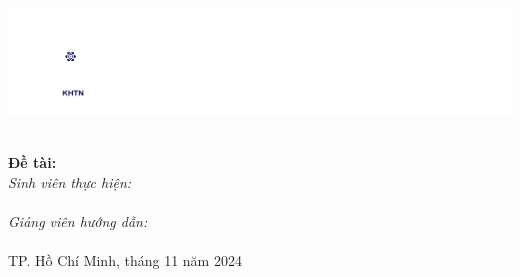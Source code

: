 \begin{titlepage}



\newcommand{\HRule}{\rule{\linewidth}{0.5mm}}

\includegraphics[scale=.15]{img/Logo-FIT.png}\\[1cm] 

{ 
\huge{\bfseries{\reporttitle}}\\[0.5cm]
\large{\bfseries{Đề tài: \reportname}}
}\\[0.4cm]

\emph{Sinh viên thực hiện:}\\
\studentname\\[1cm]

\emph{Giảng viên hướng dẫn:} \\
\teachername\\[3cm]

{\large TP. Hồ Chí Minh, tháng 11 năm 2024}

\vfill


\end{titlepage}
	
